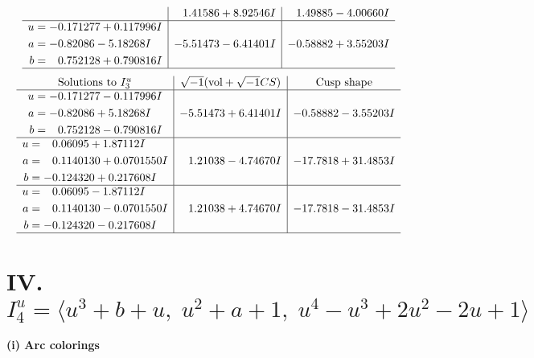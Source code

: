 \documentclass[1p]{elsarticle_modified}
\theoremstyle{definition}
\newcommand{\I}{\sqrt{-1}}
\begin{document}
$$\begin{array}{c|c|c}
 & \phantom{-}1.41586 + 8.92546 I & \phantom{-}1.49885 - 4.00660 I \\ \hline\begin{aligned}
u &= -0.171277 + 0.117996 I \\
a &= -0.82086 - 5.18268 I \\
b &= \phantom{-}0.752128 + 0.790816 I\end{aligned}
 & -5.51473 - 6.41401 I & -0.58882 + 3.55203 I\\
 \hline 
 \end{array}$$\newpage$$\begin{array}{c|c|c}  
\text{Solutions to }I^u_{3}& \I (\text{vol} + \sqrt{-1}CS) & \text{Cusp shape}\\
 \hline 
\begin{aligned}
u &= -0.171277 - 0.117996 I \\
a &= -0.82086 + 5.18268 I \\
b &= \phantom{-}0.752128 - 0.790816 I\end{aligned}
 & -5.51473 + 6.41401 I & -0.58882 - 3.55203 I \\ \hline\begin{aligned}
u &= \phantom{-}0.06095 + 1.87112 I \\
a &= \phantom{-}0.1140130 + 0.0701550 I \\
b &= -0.124320 + 0.217608 I\end{aligned}
 & \phantom{-}1.21038 - 4.74670 I & -17.7818 + 31.4853 I \\ \hline\begin{aligned}
u &= \phantom{-}0.06095 - 1.87112 I \\
a &= \phantom{-}0.1140130 - 0.0701550 I \\
b &= -0.124320 - 0.217608 I\end{aligned}
 & \phantom{-}1.21038 + 4.74670 I & -17.7818 - 31.4853 I\\
 \hline 
 \end{array}$$\newpage\newpage\renewcommand{\arraystretch}{1}
\centering \section*{IV. $I^u_{4}= \langle u^3+b+u,\;u^2+a+1,\;u^4- u^3+2 u^2-2 u+1 \rangle$}
\flushleft \textbf{(i) Arc colorings}\\
\end{document}
